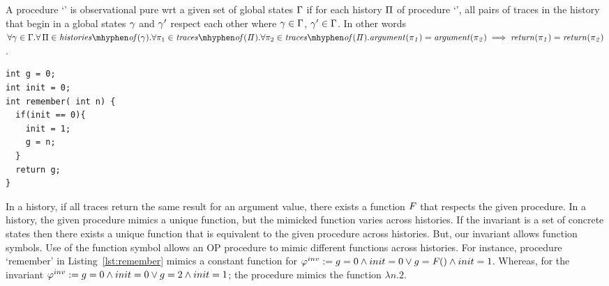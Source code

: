 \begin{definition}
  A procedure `\foo' is observational pure wrt a given set of global
  states $\Gamma$ if for each history $\Pi$ of procedure
  `\foo', all pairs of traces in the history that begin in a global
  states $\gamma$ and $\gamma'$ respect each other where $\gamma
  \in \Gamma$, $\gamma' \in \Gamma$.  In other words
  $\forall \gstate \in \Gstates.\forall \, \history \in
  \historyOf{\gstate}. \forall \trace_1 \in
  \tracesOf{\history}. \forall \trace_2 \in
  \tracesOf{\history}.\\ \param{\trace_1} = \param{\trace_2} \implies
  \return{\trace_1} = \return{\trace_2}$.
\end{definition}

\begin{lstlisting}[caption={Procedure `remember' : always returns the
      argument from its first call}, label=lst:remember]
int g = 0;
int init = 0;
int remember( int n) {
  if(init == 0){
    init = 1;
    g = n;
  }
  return g;
}
\end{lstlisting}

In a history, if all traces return the same result for an argument
value, there exists a function $\mathit{F}$ that respects the given
procedure. In a history, the given procedure mimics a unique function,
but the mimicked function varies across histories. If the invariant is
a set of concrete states then there exists a unique function that is
equivalent to the given procedure across histories. But, our invariant
allows function symbols. Use of the function symbol allows an OP
procedure to mimic different functions across histories. For instance,
procedure `remember' in Listing~\ref{lst:remember} mimics a constant
function for $\varphi^{inv} := g=0 \wedge init=0 \vee g= \mathit{F}() \wedge
init=1$. Whereas, for the invariant $\varphi^{inv} := g=0 \wedge init=0 \vee
g=2 \wedge init=1$; the procedure mimics the function $\lambda n.2$.

